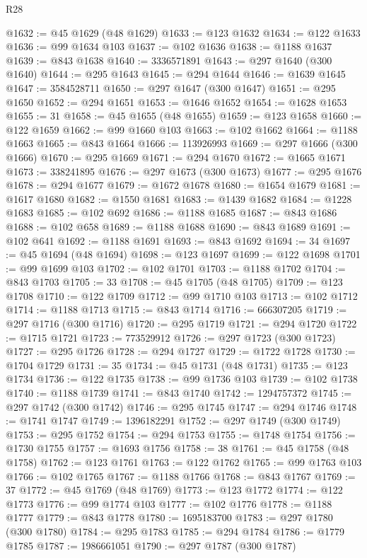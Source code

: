 \begin{lexlean}{R28}
\begin{coremodule}
@1632 := @45 @1629 (@48 @1629)
@1633 := @123 @1632
@1634 := @122 @1633
@1636 := @99 @1634 @103
@1637 := @102 @1636
@1638 := @1188 @1637
@1639 := @843 @1638
@1640 := 3336571891
@1643 := @297 @1640 (@300 @1640)
@1644 := @295 @1643
@1645 := @294 @1644
@1646 := @1639 @1645
@1647 := 3584528711
@1650 := @297 @1647 (@300 @1647)
@1651 := @295 @1650
@1652 := @294 @1651
@1653 := @1646 @1652
@1654 := @1628 @1653
@1655 := 31
@1658 := @45 @1655 (@48 @1655)
@1659 := @123 @1658
@1660 := @122 @1659
@1662 := @99 @1660 @103
@1663 := @102 @1662
@1664 := @1188 @1663
@1665 := @843 @1664
@1666 := 113926993
@1669 := @297 @1666 (@300 @1666)
@1670 := @295 @1669
@1671 := @294 @1670
@1672 := @1665 @1671
@1673 := 338241895
@1676 := @297 @1673 (@300 @1673)
@1677 := @295 @1676
@1678 := @294 @1677
@1679 := @1672 @1678
@1680 := @1654 @1679
@1681 := @1617 @1680
@1682 := @1550 @1681
@1683 := @1439 @1682
@1684 := @1228 @1683
@1685 := @102 @692
@1686 := @1188 @1685
@1687 := @843 @1686
@1688 := @102 @658
@1689 := @1188 @1688
@1690 := @843 @1689
@1691 := @102 @641
@1692 := @1188 @1691
@1693 := @843 @1692
@1694 := 34
@1697 := @45 @1694 (@48 @1694)
@1698 := @123 @1697
@1699 := @122 @1698
@1701 := @99 @1699 @103
@1702 := @102 @1701
@1703 := @1188 @1702
@1704 := @843 @1703
@1705 := 33
@1708 := @45 @1705 (@48 @1705)
@1709 := @123 @1708
@1710 := @122 @1709
@1712 := @99 @1710 @103
@1713 := @102 @1712
@1714 := @1188 @1713
@1715 := @843 @1714
@1716 := 666307205
@1719 := @297 @1716 (@300 @1716)
@1720 := @295 @1719
@1721 := @294 @1720
@1722 := @1715 @1721
@1723 := 773529912
@1726 := @297 @1723 (@300 @1723)
@1727 := @295 @1726
@1728 := @294 @1727
@1729 := @1722 @1728
@1730 := @1704 @1729
@1731 := 35
@1734 := @45 @1731 (@48 @1731)
@1735 := @123 @1734
@1736 := @122 @1735
@1738 := @99 @1736 @103
@1739 := @102 @1738
@1740 := @1188 @1739
@1741 := @843 @1740
@1742 := 1294757372
@1745 := @297 @1742 (@300 @1742)
@1746 := @295 @1745
@1747 := @294 @1746
@1748 := @1741 @1747
@1749 := 1396182291
@1752 := @297 @1749 (@300 @1749)
@1753 := @295 @1752
@1754 := @294 @1753
@1755 := @1748 @1754
@1756 := @1730 @1755
@1757 := @1693 @1756
@1758 := 38
@1761 := @45 @1758 (@48 @1758)
@1762 := @123 @1761
@1763 := @122 @1762
@1765 := @99 @1763 @103
@1766 := @102 @1765
@1767 := @1188 @1766
@1768 := @843 @1767
@1769 := 37
@1772 := @45 @1769 (@48 @1769)
@1773 := @123 @1772
@1774 := @122 @1773
@1776 := @99 @1774 @103
@1777 := @102 @1776
@1778 := @1188 @1777
@1779 := @843 @1778
@1780 := 1695183700
@1783 := @297 @1780 (@300 @1780)
@1784 := @295 @1783
@1785 := @294 @1784
@1786 := @1779 @1785
@1787 := 1986661051
@1790 := @297 @1787 (@300 @1787)

\end{coremodule}
\end{lexlean}
